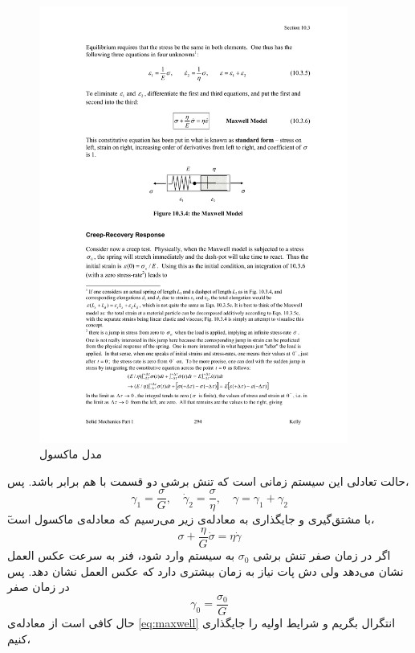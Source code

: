 \begin{figure}[htbp]
\begin{center}
\includegraphics[width=4in]{Figs/spring_dashpot}
\caption{
مدل ماکسول
}
\label{fig:SD}
\end{center}
\end{figure}

حالت تعادلی این سیستم زمانی است که تنش برشی دو قسمت با هم برابر باشد. پس،
\begin{equation}
\gamma_1=\frac{\sigma}{G}, \quad \dot\gamma_2=\frac{\sigma}{\eta}, \quad \gamma=\gamma_1+\gamma_2
\end{equation}
ٓبا مشتق‌گیری و جایگذاری به معادله‌ی زیر می‌رسیم که معادله‌ی ماکسول است،
\begin{equation}
\sigma+\frac{\eta}{G}\dot\sigma=\eta\dot\gamma
\label{eq:maxwell}
\end{equation}
اگر در زمان صفر تنش برشی $\sigma_0$ به سیستم وارد شود، فنر به سرعت عکس العمل نشان می‌دهد ولی دش پات نیاز به زمان بیشتری دارد که عکس العمل نشان دهد. پس در زمان صفر
\begin{equation}
\gamma_0=\frac{\sigma_0}{G}
\end{equation}
حال کافی‌ است از  معادله‌ی \ref{eq:maxwell}  انتگرال بگریم و شرایط اولیه را جایگذاری کنیم،

